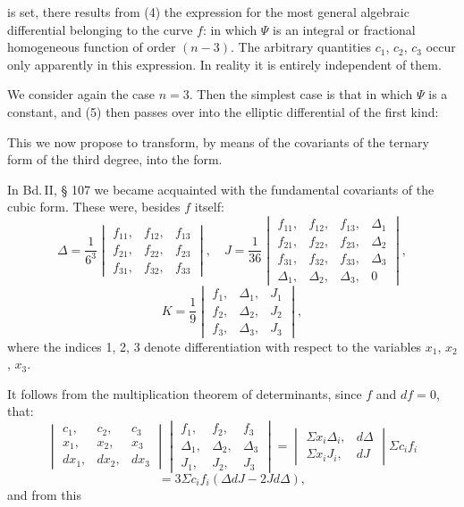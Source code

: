 is set, there results from (4) the expression for the most general
algebraic differential belonging to the curve $f$:
in which $\Psi$ is an integral or fractional homogeneous function of
order $(n-3)$. The arbitrary quantities $c_1$, $c_2$, $c_3$
occur only apparently in this expression. In reality
it is entirely independent of them.

We consider again the case $n=3$. Then the simplest
case is that in which $\Psi$ is a constant, and (5) then passes over
into the elliptic differential of the first kind:

This we now propose to transform, by means of the covariants of the ternary
form of the third degree, into the  form.

In Bd.\,II, § 107 we became acquainted with the fundamental covariants of the
cubic form. These were, besides $f$ itself:
\[
\Delta = \frac{1}{6^3}\begin{vmatrix} f_{11}, & f_{12}, & f_{13} \\ f_{21}, & f_{22}, & f_{23} \\ f_{31}, & f_{32}, & f_{33} \end{vmatrix}, \quad
J = \frac{1}{36}\begin{vmatrix} f_{11}, & f_{12}, & f_{13}, & \Delta_1 \\ f_{21}, & f_{22}, & f_{23}, & \Delta_2 \\ f_{31}, & f_{32}, & f_{33}, & \Delta_3 \\ \Delta_1, & \Delta_2, & \Delta_3, & 0 \end{vmatrix},
\]
\[
K = \frac{1}{9}\begin{vmatrix} f_1, & \Delta_1, & J_1 \\ f_2, & \Delta_2, & J_2 \\ f_3, & \Delta_3, & J_3 \end{vmatrix},
\]
where the indices 1, 2, 3 denote differentiation with respect to the variables
$x_1$, $x_2$, $x_3$.

It follows from the multiplication theorem of determinants, since
$f$ and $df=0$, that:
\[
\begin{vmatrix} c_1, & c_2, & c_3 \\ x_1, & x_2, & x_3 \\ dx_1, & dx_2, & dx_3 \end{vmatrix}
\begin{vmatrix} f_1, & f_2, & f_3 \\ \Delta_1, & \Delta_2, & \Delta_3 \\ J_1, & J_2, & J_3 \end{vmatrix}
=
\begin{vmatrix} \Sigma x_i\Delta_i, & d\Delta \\ \Sigma x_iJ_i, & dJ \end{vmatrix}
\Sigma c_if_i
\]
\[
= 3\Sigma c_if_i(\Delta dJ - 2Jd\Delta),
\]
and from this
